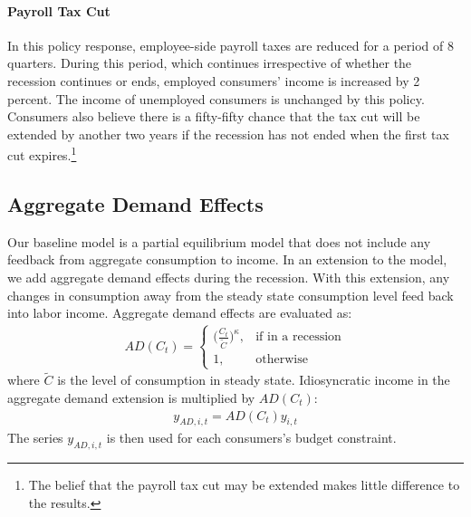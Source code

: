 \documentclass[../HAFiscal]{subfiles}
\begin{document}
	\paragraph{Payroll Tax Cut} In this policy response, employee-side payroll taxes are reduced for a period of 8 quarters. During this period, which continues irrespective of whether the recession continues or ends, employed consumers' income is increased by 2 percent. The income of unemployed consumers is unchanged by this policy. Consumers also believe there is a fifty-fifty chance that the tax cut will be extended by another two years if the recession has not ended when the first tax cut expires.\footnote{The belief that the payroll tax cut may be extended makes little difference to the results.}

	\subsection{Aggregate Demand Effects}
	Our baseline model is a partial equilibrium model that does not include any feedback from aggregate consumption to income. In an extension to the model, we add aggregate demand effects during the recession. With this extension, any changes in consumption away from the steady state consumption level feed back into labor income. Aggregate demand effects are evaluated as:
	\begin{align}
	AD(C_t) =   \begin{cases}
				\Big(\frac{C_t}{\tilde{C}}\Big)^\kappa, & \text{if in a recession} \\
				1, & \text{otherwise} 
				\end{cases}
	\end{align}
	where $\tilde{C}$ is the level of consumption in steady state. Idiosyncratic income in the aggregate demand extension is multiplied by $AD(C_t)$:
	\begin{align}
	y_{AD,i,t} = AD(C_t)y_{i,t}
	\end{align}
	The series $y_{AD,i,t}$ is then used for each consumers's budget constraint.
\end{document}
